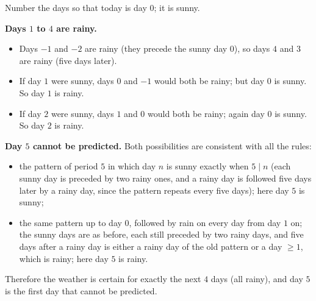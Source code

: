 Number the days so that today is day $0$; it is sunny.

\textbf{Days $1$ to $4$ are rainy.}
\begin{itemize}
\item Days $-1$ and $-2$ are rainy (they precede the sunny day $0$), so days $4$ and $3$ are rainy (five days later).
\item If day $1$ were sunny, days $0$ and $-1$ would both be rainy; but day $0$ is sunny. So day $1$ is rainy.
\item If day $2$ were sunny, days $1$ and $0$ would both be rainy; again day $0$ is sunny. So day $2$ is rainy.
\end{itemize}

\textbf{Day $5$ cannot be predicted.} Both possibilities are consistent with all the rules:
\begin{itemize}
\item the pattern of period $5$ in which day $n$ is sunny exactly when $5\mid n$ (each sunny day is preceded by two rainy ones, and a rainy day is followed five days later by a rainy day, since the pattern repeats every five days); here day $5$ is sunny;
\item the same pattern up to day $0$, followed by rain on every day from day $1$ on; the sunny days are as before, each still preceded by two rainy days, and five days after a rainy day is either a rainy day of the old pattern or a day $\ge1$, which is rainy; here day $5$ is rainy.
\end{itemize}
Therefore the weather is certain for exactly the next $\boxed{4}$ days (all rainy), and day $5$ is the first day that cannot be predicted.
